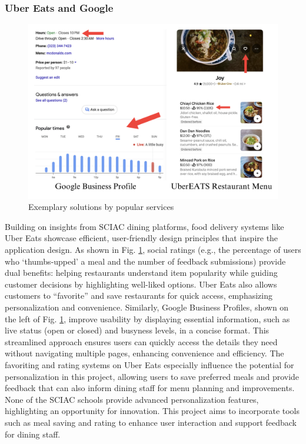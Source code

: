 \documentclass[10pt,twocolumn]{article}
\begin{document}
\subsubsection{Uber Eats and Google}
    \begin{figure} [H]
    \centering
    \includegraphics[width=.95\linewidth]{images/ubereats.png} %
    \caption{
        Exemplary solutions by popular services
    }\label{uberEATS}
\end{figure}
Building on insights from SCIAC dining platforms, food delivery systems like Uber Eats showcase efficient, user-friendly design principles that inspire the application design. As shown in Fig. \ref{uberEATS}, social ratings (e.g., the percentage of users who ‘thumbs-upped’ a meal and the number of feedback submissions) provide dual benefits: helping restaurants understand item popularity while guiding customer decisions by highlighting well-liked options. Uber Eats also allows customers to “favorite” and save restaurants for quick access, emphasizing personalization and convenience. Similarly, Google Business Profiles, shown on the left of Fig. \ref{uberEATS}, improve usability by displaying essential information, such as live status (open or closed) and busyness levels, in a concise format. This streamlined approach ensures users can quickly access the details they need without navigating multiple pages, enhancing convenience and efficiency. The favoriting and rating systems on Uber Eats especially influence the potential for personalization in this project, allowing users to save preferred meals and provide feedback that can also inform dining staff for menu planning and improvements. None of the SCIAC schools provide advanced personalization features, highlighting an opportunity for innovation. This project aims to incorporate tools such as meal saving and rating to enhance user interaction and support feedback for dining staff. 
\end{document}
